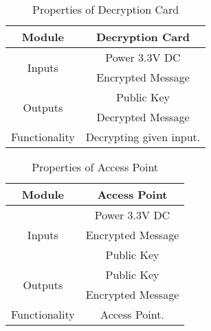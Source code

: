 \documentclass[12pt]{article}
\begin{document}
	\begin{table}[h]
		
		\centering	
		\label{Properties of Decryption Card }
		\begin{tabular}{|c|c|}
			\hline
			Module & Decryption Card\\ \hline
			\multirow{2}{*}{Inputs} & Power 3.3V DC \\ \cline{2-2}
			& Encrypted Message \\ \hline
			\multirow{2}{*}{Outputs} & Public Key \\ \cline{2-2}
			& Decrypted Message \\ \hline
			Functionality & Decrypting given input.\\ \hline	
			
		\end{tabular}
		\caption{Properties of Decryption Card}
		
	\end{table}
	\begin{table}[H]
		
		\centering		
		\label{Properties of Access Point }
		\begin{tabular}{|c|c|}
			\hline
			Module & Access Point \\ \hline
			\multirow{3}{*}{Inputs} & Power 3.3V DC \\
			
			\cline{2-2}
			& Encrypted Message \\
			
			\cline{2-2}
			& Public Key \\
			\cline{2-2} \hline
			
			\multirow{2}{*}{Outputs} 	& Public Key \\
			\cline{2-2}
			& Encrypted Message \\
			
			\cline{2-2} \hline
			
			Functionality & Access Point.\\ \hline	
			
		\end{tabular}
		\caption{Properties of Access Point}
		
	\end{table}
	
\end{document}

